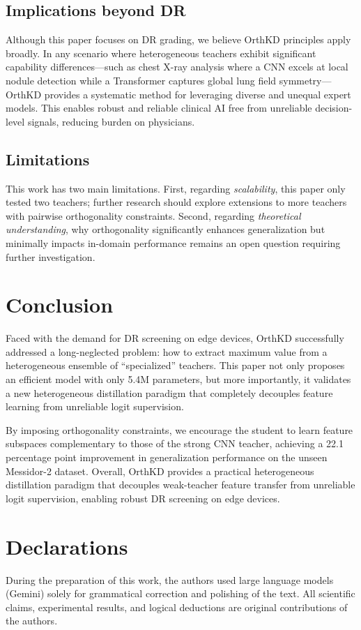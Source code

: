 \documentclass{article}
\begin{document}
\subsection{Implications beyond DR}
Although this paper focuses on DR grading, we believe OrthKD principles apply broadly. In any scenario where heterogeneous teachers exhibit significant capability differences---such as chest X-ray analysis where a CNN excels at local nodule detection while a Transformer captures global lung field symmetry---OrthKD provides a systematic method for leveraging diverse and unequal expert models. This enables robust and reliable clinical AI free from unreliable decision-level signals, reducing burden on physicians.

\subsection{Limitations}
This work has two main limitations. First, regarding \textit{scalability}, this paper only tested two teachers; further research should explore extensions to more teachers with pairwise orthogonality constraints. Second, regarding \textit{theoretical understanding}, why orthogonality significantly enhances generalization but minimally impacts in-domain performance remains an open question requiring further investigation.


\section{Conclusion}

Faced with the demand for DR screening on edge devices, OrthKD successfully addressed a long-neglected problem: how to extract maximum value from a heterogeneous ensemble of ``specialized'' teachers. This paper not only proposes an efficient model with only 5.4M parameters, but more importantly, it validates a new heterogeneous distillation paradigm that completely decouples feature learning from unreliable logit supervision.

By imposing orthogonality constraints, we encourage the student to learn feature subspaces complementary to those of the strong CNN teacher, achieving a 22.1 percentage point improvement in generalization performance on the unseen Messidor-2 dataset. Overall, OrthKD provides a practical heterogeneous distillation paradigm that decouples weak-teacher feature transfer from unreliable logit supervision, enabling robust DR screening on edge devices.

\section*{Declarations}

During the preparation of this work, the authors used large language models (Gemini) solely for grammatical correction and polishing of the text. All scientific claims, experimental results, and logical deductions are original contributions of the authors.



\end{document}
